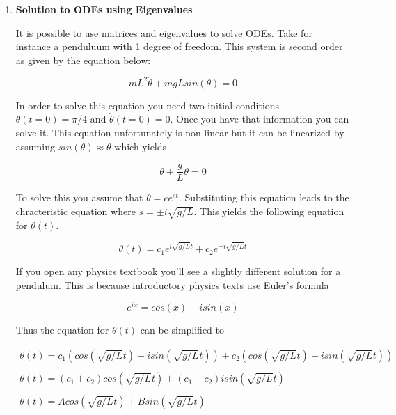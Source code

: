 \begin{enumerate}
  \item {\bf Solution to ODEs using Eigenvalues}

    It is possible to use matrices and eigenvalues to solve ODEs. Take
    for instance a penduluum with 1 degree of freedom. This system is
    second order as given by the equation below:
    
    \begin{equation}\label{e:full2}
      mL^2\ddot{\theta} + mgLsin(\theta) = 0
    \end{equation}

    In order to solve this equation you need two initial conditions
    $\theta(t=0) = \pi/4$ and $\dot{\theta}(t=0) = 0$. Once you have that
    information you can solve it. This equation unfortunately is
    non-linear but it can be linearized by assuming
    $sin(\theta)\approx \theta$ which yields

    \begin{equation}\label{e:full2}
      \ddot{\theta} + \frac{g}{L}\theta = 0
    \end{equation}

    To solve this you assume that $\theta = ce^{st}$. Substituting
    this equation leads to the chracteristic equation where $s=\pm
    i\sqrt{g/L}$. This yields the following equation for $\theta(t)$.

    \begin{equation} 
      \theta(t) = c_1 e^{i\sqrt{g/L}t} + c_2 e^{-i\sqrt{g/L}t}
    \end{equation}

    If you open any physics textbook you'll see a slightly different
    solution for a pendulum. This is because introductory physics
    texts use Euler's formula

    \begin{equation}
      e^{ix} = cos(x) + isin(x)
    \end{equation}

    Thus the equation for $\theta(t)$ can be simplified to 

    \begin{equation}
      \begin{matrix}
      \theta(t) = c_1(cos(\sqrt{g/L}t) + isin(\sqrt{g/L}t)) +
      c_2(cos(\sqrt{g/L}t) - isin(\sqrt{g/L}t)) \\
      \ \\
      \theta(t) = (c_1+c_2)cos(\sqrt{g/L}t) +
      (c_1-c_2)isin(\sqrt{g/L}t)\\ 
      \ \\
      \theta(t) = Acos(\sqrt{g/L} t) + Bsin(\sqrt{g/L} t)
      \end{matrix}
    \end{equation}


\end{enumerate}
